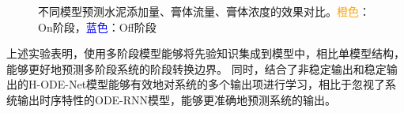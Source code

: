 \begin{figure}
\caption{不同模型预测水泥添加量、膏体流量、膏体浓度的效果对比。\textcolor{orange}{橙色}：On阶段，\textcolor{blue}{蓝色}：Off阶段} %
\label{fig:4_paste_models}  %
\end{figure}
上述实验表明，使用多阶段模型能够将先验知识集成到模型中，相比单模型结构，能够更好地预测多阶段系统的阶段转换边界。
同时，结合了非稳定输出和稳定输出的H-ODE-Net模型能够有效地对系统的多个输出项进行学习，相比于忽视了系统输出时序特性的ODE-RNN模型，能够更准确地预测系统的输出。

